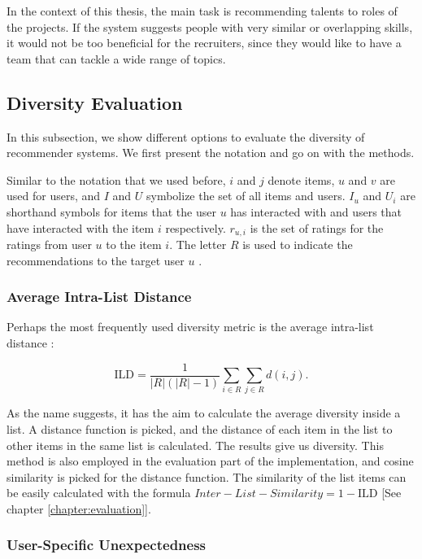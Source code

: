 In the context of this thesis, the main task is recommending talents to roles of the projects. If the system suggests people with very similar or overlapping skills, it would not be too beneficial for the recruiters, since they would like to have a team that can tackle a wide range of topics.

\subsection{Diversity Evaluation}

In this subsection, we show different options to evaluate the diversity of recommender systems. We first present the notation and go on with the methods.

Similar to the notation that we used before, $i$ and $j$ denote items, $u$ and $v$ are used for users, and $I$ and $U$ symbolize the set of all items and users. $I_u$ and $U_i$ are shorthand symbols for items that the user $u$ has interacted with and users that have interacted with the item $i$ respectively. $r_{u, i}$ is the set of ratings for the ratings from user $u$ to the item $i$. The letter $R$ is used to indicate the recommendations to the target user $u$ \cite{castells2015novelty}.

\subsubsection{Average Intra-List Distance}

Perhaps the most frequently used diversity metric is the average intra-list distance \cite{castells2015novelty}: 

\begin{equation}
\mathrm { ILD } = \frac { 1 } { | R | ( | R | - 1 ) } \sum _ { i \in R } \sum _ { j \in R } d ( i , j ) .
\label{eq:ild}
\end{equation}

As the name suggests, it has the aim to calculate the average diversity inside a list. A distance function is picked, and the distance of each item in the list to other items in the same list is calculated. The results give us diversity. This method is also employed in the evaluation part of the implementation, and cosine similarity is picked for the distance function. The similarity of the list items can be easily calculated with the formula $Inter-List-Similarity = 1 - \mathrm {ILD}$ [See chapter \ref{chapter:evaluation}].


\subsubsection{User-Specific Unexpectedness}\label{research-unexp}

